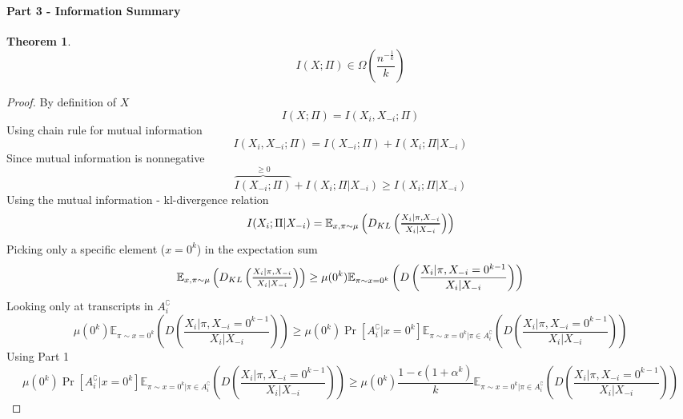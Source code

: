 \documentclass{article}
\newcommand{\Dfrac}[2]{%
  \ooalign{%
    $\genfrac{}{}{1.2pt}1{#1}{#2}$\cr%
    $\color{white}\genfrac{}{}{.4pt}1{\phantom{#1}}{\phantom{#2}}$}%
}
\theoremstyle{plain}
\newtheorem{theorem}{Theorem}[section]
\begin{document}
\paragraph{Part 3 - Information Summary}
\begin{theorem}
\begin{equation*}
    I(X;\Pi) \in \Omega\left(\frac{n^{-\frac{1}{k}}}{k}\right)
\end{equation*}
\end{theorem}
\begin{proof}
By definition of $X$
\begin{equation*}
    I(X;\Pi) = I(X_i,X_{-i};\Pi)
\end{equation*}
Using chain rule for mutual information
\begin{equation*}
    I(X_i,X_{-i};\Pi) = I(X_{-i}; \Pi) + I(X_i;\Pi|X_{-i})
\end{equation*}
Since mutual information is nonnegative
\begin{equation*}
    \overbrace{I(X_{-i}; \Pi)}^{\geq 0} + I(X_i;\Pi|X_{-i}) \geq I(X_i;\Pi|X_{-i})
\end{equation*}
Using the mutual information - kl-divergence relation
\begin{equation*}
    I(X_i;\Pi|X_{-i}) = \mathbb{E}_{x, \pi \sim \mu} \left( D_{KL}\left(\Dfrac{X_i | \pi, X_{-i}}{X_i | X_{-i}} \right) \right)
\end{equation*}
Picking only a specific element ($x=0^k$) in the expectation sum
\begin{equation*}
    \mathbb{E}_{x, \pi \sim \mu} \left( D_{KL}\left(\Dfrac{X_i | \pi, X_{-i}}{X_i | X_{-i}} \right) \right) \geq \mu(0^k) \mathbb{E}_{\pi \sim x = 0^k} \left( D\left(\frac{X_i | \pi, X_{-i} = 0^{k-1}}{X_i | X_{-i}} \right) \right)
\end{equation*}
Looking only at transcripts in $A_{i}^\complement$
\begin{equation*}
    \mu(0^k) \mathbb{E}_{\pi \sim x = 0^k} \left( D\left(\frac{X_i | \pi, X_{-i} = 0^{k-1}}{X_i | X_{-i}} \right) \right) \geq \mu(0^k) \Pr[A_{i}^\complement| x = 0^k] \mathbb{E}_{\pi \sim x = 0^k| \pi \in A_{i}^\complement} \left( D\left(\frac{X_i | \pi, X_{-i} = 0^{k-1}}{X_i | X_{-i}} \right) \right)
\end{equation*}
Using Part 1
\begin{equation*}
    \mu(0^k) \Pr[A_{i}^\complement| x = 0^k] \mathbb{E}_{\pi \sim x = 0^k| \pi \in A_{i}^\complement} \left( D\left(\frac{X_i | \pi, X_{-i} = 0^{k-1}}{X_i | X_{-i}} \right) \right) \geq \mu(0^k) \frac{1 - \epsilon (1 + \alpha ^k)}{k} \mathbb{E}_{\pi \sim x = 0^k| \pi \in A_{i}^\complement} \left( D\left(\frac{X_i | \pi, X_{-i} = 0^{k-1}}{X_i | X_{-i}} \right) \right)

\end{equation*}
\end{proof}
\end{document}
